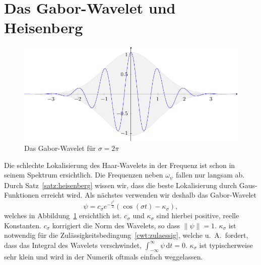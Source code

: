 \section{Das Gabor-Wavelet und Heisenberg}
\begin{figure}
	\centering
	\includegraphics{papers/complex/images/gabor.pdf}
	\caption{Das Gabor-Wavelet für $\sigma = 2\pi$ \label{complex:gabor}}
\end{figure}

Die schlechte Lokalisierung des Haar-Wavelets in der Frequenz ist schon in seinem Spektrum ersichtlich.
Die Frequenzen neben $\omega_\psi$ fallen nur langsam ab.
Durch Satz~\ref{satz:heisenberg} wissen wir, dass die beste Lokalisierung durch Gaus-Funktionen erreicht wird.
Als nächstes verwenden wir deshalb das Gabor-Wavelet
\[
	\psi = c_\sigma e^{-\frac{t^2}{2}}\left(\cos\left(\sigma t\right) - \kappa_\sigma\right),
\]
welches in Abbildung~\ref{complex:gabor} ersichtlich ist.
$c_\sigma$ und $\kappa_\sigma$ sind hierbei positive, reelle Konstanten.
$c_\sigma$ korrigiert die Norm des Wavelets, so dass $\|\psi\| = 1$.
$\kappa_\sigma$ ist notwendig für die Zulässigkeitsbedingung~\eqref{cwt:zulaessig}, welche u.~A.~fordert, dass das Integral des Wavelets verschwindet,  $\int_{-\infty}^{\infty}\psi\,\mathrm{d}t = 0$.
$\kappa_\sigma$ ist typischerweise sehr klein und wird in der Numerik oftmals einfach weggelassen.

